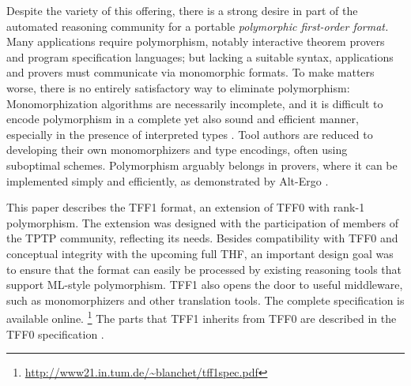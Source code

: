 Despite the variety of this offering, there is a strong desire in part of the automated
reasoning community for a portable \emph{polymorphic first-order format.} Many applications
require polymorphism, notably interactive theorem provers and program
specification languages; but lacking a suitable syntax, applications
and provers must communicate via monomorphic formats. To make matters worse, there is no entirely
satisfactory way to eliminate polymorphism: Monomorphization algorithms are %
necessarily incomplete,
and it is difficult to encode polymorphism in a complete yet
also sound and efficient manner,
especially in the presence of interpreted types
\cite{blanchette-et-al-2013-types,bobot-paskevich-2011,leino-ruemmer-2010}. Tool authors
are reduced to developing their own monomorphizers and type encodings, often
using suboptimal schemes. Polymorphism arguably belongs in
provers, where it can be implemented simply and efficiently, as demonstrated by
Alt-Ergo \cite{bobot-et-al-2008}.

\pagebreak

This paper describes the TFF1
format, an extension of TFF0 with rank-1 polymorphism.
The extension was designed with the participation of members of the TPTP
community, reflecting its needs.
Besides compatibility with TFF0 and conceptual integrity with the upcoming full
THF, an important design goal was to ensure that the format can easily be
processed by existing reasoning tools that support ML-style polymorphism. TFF1
also opens the door to useful middleware, such as monomorphizers and other
translation tools. The complete specification is available online.%
\footnote{\url{http://www21.in.tum.de/~blanchet/tff1spec.pdf}}
%
The parts that TFF1 inherits from TFF0
are described in the TFF0 specification \cite{sutcliffe-et-al-2012-tff0}.
